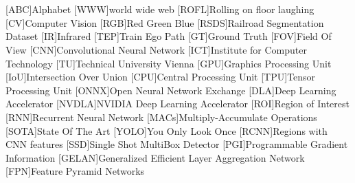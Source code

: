 {}
\chapter*{\listacroname}
\begin{acronym}[XXXXX]
    [ABC]{Alphabet}
    [WWW]{world wide web}
    [ROFL]{Rolling on floor laughing}
    [CV]{Computer Vision}
    [RGB]{Red Green Blue}
    [RSDS]{Railroad Segmentation Dataset}
    [IR]{Infrared}
    [TEP]{Train Ego Path}
    [GT]{Ground Truth}
    [FOV]{Field Of View}
    [CNN]{Convolutional Neural Network}
    [ICT]{Institute for Computer Technology}
    [TU]{Technical University Vienna}
    [GPU]{Graphics Processing Unit}
    [IoU]{Intersection Over Union}
    [CPU]{Central Processing Unit}
    [TPU]{Tensor Processing Unit}
    [ONNX]{Open Neural Network Exchange}
    [DLA]{Deep Learning Accelerator}
    [NVDLA]{NVIDIA Deep Learning Accelerator}
    [ROI]{Region of Interest}
    [RNN]{Recurrent Neural Network}
    [MACs]{Multiply-Accumulate Operations}
    [SOTA]{State Of The Art}
    [YOLO]{You Only Look Once}
    [RCNN]{Regions with CNN features}
    [SSD]{Single Shot MultiBox Detector}
    [PGI]{Programmable Gradient Information}
    [GELAN]{Generalized Efficient Layer Aggregation Network}
    [FPN]{Feature Pyramid Networks}
\end{acronym}